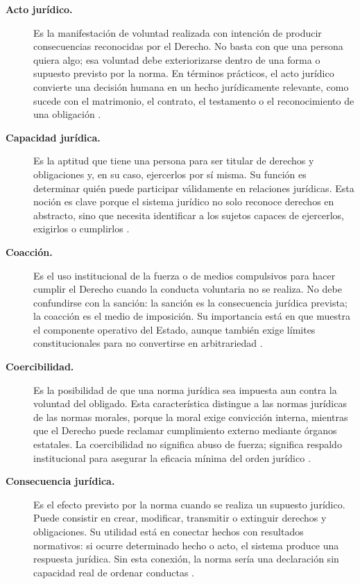 \documentclass[
	spanish,
	letterpaper, oneside
]{article}
\begin{document}
\begin{description}

\item[\textbf{Acto jurídico.}]
Es la manifestación de voluntad realizada con intención de producir consecuencias reconocidas por el Derecho. No basta con que una persona quiera algo; esa voluntad debe exteriorizarse dentro de una forma o supuesto previsto por la norma. En términos prácticos, el acto jurídico convierte una decisión humana en un hecho jurídicamente relevante, como sucede con el matrimonio, el contrato, el testamento o el reconocimiento de una obligación \citep{garciaMaynez2002,poderJudicialGto2007}.

\item[\textbf{Capacidad jurídica.}]
Es la aptitud que tiene una persona para ser titular de derechos y obligaciones y, en su caso, ejercerlos por sí misma. Su función es determinar quién puede participar válidamente en relaciones jurídicas. Esta noción es clave porque el sistema jurídico no solo reconoce derechos en abstracto, sino que necesita identificar a los sujetos capaces de ejercerlos, exigirlos o cumplirlos \citep{garciaMaynez2002,poderJudicialGto2007}.

\item[\textbf{Coacción.}]
Es el uso institucional de la fuerza o de medios compulsivos para hacer cumplir el Derecho cuando la conducta voluntaria no se realiza. No debe confundirse con la sanción: la sanción es la consecuencia jurídica prevista; la coacción es el medio de imposición. Su importancia está en que muestra el componente operativo del Estado, aunque también exige límites constitucionales para no convertirse en arbitrariedad \citep{poderJudicialGto2007,garciaMaynez2002}.

\item[\textbf{Coercibilidad.}]
Es la posibilidad de que una norma jurídica sea impuesta aun contra la voluntad del obligado. Esta característica distingue a las normas jurídicas de las normas morales, porque la moral exige convicción interna, mientras que el Derecho puede reclamar cumplimiento externo mediante órganos estatales. La coercibilidad no significa abuso de fuerza; significa respaldo institucional para asegurar la eficacia mínima del orden jurídico \citep{garciaMaynez2002,launDerechoMoral2021}.

\item[\textbf{Consecuencia jurídica.}]
Es el efecto previsto por la norma cuando se realiza un supuesto jurídico. Puede consistir en crear, modificar, transmitir o extinguir derechos y obligaciones. Su utilidad está en conectar hechos con resultados normativos: si ocurre determinado hecho o acto, el sistema produce una respuesta jurídica. Sin esta conexión, la norma sería una declaración sin capacidad real de ordenar conductas \citep{garciaMaynez2002,poderJudicialGto2007}.


\end{description}
\end{document}
